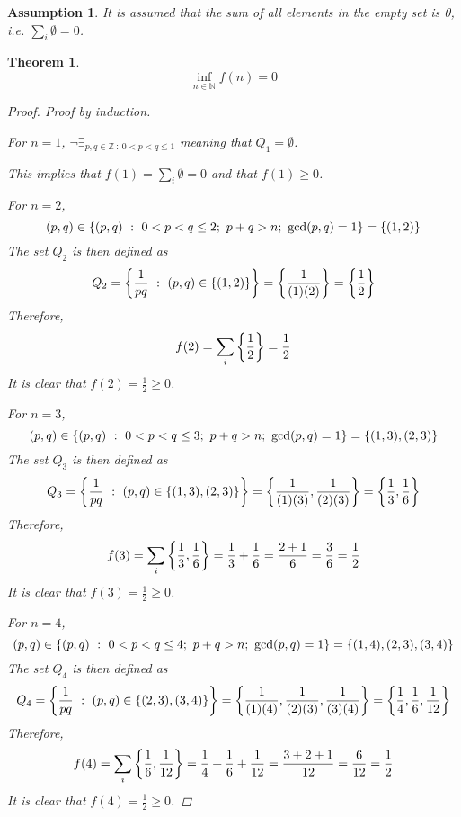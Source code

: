 \documentclass[]{article}
\newcommand{\N}{\mathbb{N}}
\newcommand{\Z}{\mathbb{Z}}
\newcommand{\st}{\ : \ }
\newtheorem{assumption}{Assumption}
\newtheorem{theorem}{Theorem}
\begin{document}
\begin{assumption}
    It is assumed that the sum of all elements in the empty set is 0, i.e. $\sum_{i} \emptyset = 0$.
\end{assumption}

\newpage
\begin{theorem}
    \[
        \inf_{n \in \N} f(n) = 0
    \]

    \begin{proof}
        Proof by induction.

        For $n = 1$, 
            $\lnot \exists_{p,q \in \Z \st 0<p<q\leq 1}$ meaning that $Q_1 = \emptyset$.
            
            This implies that $f(1) = \sum_{i} \emptyset = 0$ and that $f(1) \geq 0$.

        For $n = 2$, 
        \[
            (p,q) \in \qty{(p,q) \st 0 < p < q \leq 2; \ p + q > n; \ \gcd(p,q) = 1} = \qty{(1,2)}
        \]    
        The set $Q_2$ is then defined as
        \[
            Q_2 = \qty{\frac{1}{pq} \st (p,q) \in \qty{(1,2)}}
                = \qty{\frac{1}{(1)(2)}}
                = \qty{\frac{1}{2}}
        \]
        Therefore,
        \[
            f(2) = \sum_{i} \qty{\frac{1}{2}} = \frac{1}{2}
        \]
        It is clear that $f(2) = \frac{1}{2} \geq 0$.

        For $n = 3$,
        \[
            (p,q) \in \qty{(p,q) \st 0 < p < q \leq 3; \ p + q > n; \ \gcd(p,q) = 1} 
                = \qty{(1,3),(2,3)}
        \]
        The set $Q_3$ is then defined as
        \[
            Q_3 = \qty{\frac{1}{pq} \st (p,q) \in \qty{(1,3),(2,3)}}
                = \qty{\frac{1}{(1)(3)}, \frac{1}{(2)(3)}}
                = \qty{\frac{1}{3}, \frac{1}{6}}
        \]
        Therefore,
        \[
            f(3) = \sum_{i} \qty{\frac{1}{3}, \frac{1}{6}} 
                = \frac{1}{3} + \frac{1}{6} 
                = \frac{2 + 1}{6}
                = \frac{3}{6}
                = \frac{1}{2}
        \]
        It is clear that $f(3) = \frac{1}{2} \geq 0$.

        For $n = 4$,
        \[
            (p,q) \in \qty{(p,q) \st 0 < p < q \leq 4; \ p + q > n; \ \gcd(p,q) = 1} 
                = \qty{(1,4),(2,3),(3,4)}
        \]
        The set $Q_4$ is then defined as
        \[
            Q_4 = \qty{\frac{1}{pq} \st (p,q) \in \qty{(2,3),(3,4)}}
                = \qty{\frac{1}{(1)(4)}, \frac{1}{(2)(3)}, \frac{1}{(3)(4)}}
                = \qty{\frac{1}{4},\frac{1}{6}, \frac{1}{12}}
        \]
        Therefore,
        \[
            f(4) = \sum_{i} \qty{\frac{1}{6}, \frac{1}{12}}
                = \frac{1}{4} + \frac{1}{6} + \frac{1}{12}
                = \frac{3 + 2 + 1}{12}
                = \frac{6}{12}
                = \frac{1}{2}
        \]
        It is clear that $f(4) = \frac{1}{2} \geq 0$.


\end{proof}
\end{theorem}
\end{document}

